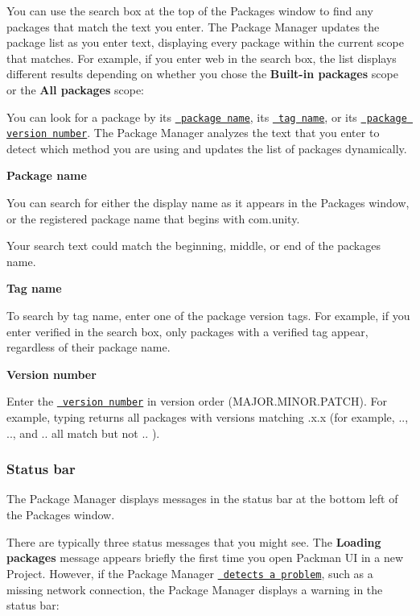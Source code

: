 You can use the search box at the top of the Packages window to find any packages that match the text you enter. The Package Manager updates the package list as you enter text, displaying every package within the current scope that matches. For example, if you enter {\ttfamily web} in the search box, the list displays different results depending on whether you chose the {\bfseries{Built-\/in packages}} scope or the {\bfseries{All packages}} scope\+:



You can look for a package by its \href{\#PackManManifestsPackage}{\texttt{ package name}}, its \href{\#version_tags}{\texttt{ tag name}}, or its \href{\#VersionList}{\texttt{ package version number}}. The Package Manager analyzes the text that you enter to detect which method you are using and updates the list of packages dynamically.

{\bfseries{Package name}}

You can search for either the display name as it appears in the Packages window, or the registered package name that begins with {\ttfamily com.\+unity}.

Your search text could match the beginning, middle, or end of the package\textquotesingle{}s name.

{\bfseries{Tag name}}

To search by tag name, enter one of the package version tags. For example, if you enter {\ttfamily verified} in the search box, only packages with a verified tag appear, regardless of their package name.

{\bfseries{Version number}}

Enter the \href{\#VersionList}{\texttt{ version number}} in version order ({\ttfamily M\+A\+J\+O\+R.\+M\+I\+N\+O\+R.\+P\+A\+T\+CH}). For example, typing {} returns all packages with versions matching {.\+x.\+x} (for example, {..}, {..}, and {..} all match but not {..} ).

\label{_statusbar}%
 \subsubsection*{Status bar}

The Package Manager displays messages in the status bar at the bottom left of the Packages window.

There are typically three status messages that you might see. The {\bfseries{Loading packages}} message appears briefly the first time you open Packman UI in a new Project. However, if the Package Manager \href{\#troubleshooting}{\texttt{ detects a problem}}, such as a missing network connection, the Package Manager displays a warning in the status bar\+:




